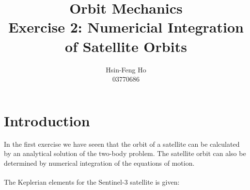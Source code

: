 \documentclass[12pt
,headinclude
,headsepline
,bibtotocnumbered
]{scrartcl}
\begin{document}
\begin{titlepage}
    \vspace{\fill}
    \title{\textbf{Orbit Mechanics \\ Exercise 2: Numericial Integration of Satellite Orbits}}
    \vspace{5cm}
    \author{Hsin-Feng Ho\\
    03770686}
    \vspace{3cm}
    \maketitle
\end{titlepage}
\section*{Introduction}
In the first exercise we have seeen that the orbit of a satellite can be calculated by an analytical solution of the two-body problem. The satellite orbit can also be determined by numerical integration of the equations of motion.
\\\\
The Keplerian elements for the Sentinel-3 satellite is given:
\begin{table}[H]
\centering
\renewcommand\arraystretch{1.5}
\end{table}
\end{document}

